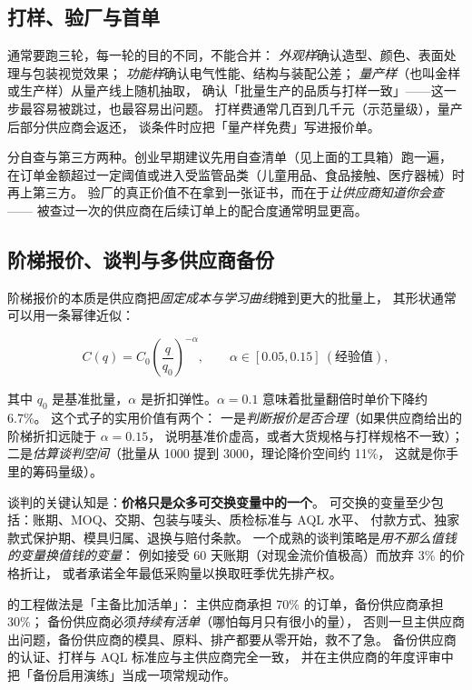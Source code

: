 \subsection{打样、验厂与首单}

通常要跑三轮，每一轮的目的不同，不能合并：
\emph{外观样}确认造型、颜色、表面处理与包装视觉效果；
\emph{功能样}确认电气性能、结构与装配公差；
\emph{量产样}（也叫金样或生产样）从量产线上随机抽取，
确认「批量生产的品质与打样一致」——这一步最容易被跳过，也最容易出问题。
打样费通常几百到几千元（示范量级），量产后部分供应商会返还，
谈条件时应把「量产样免费」写进报价单。

分自查与第三方两种。创业早期建议先用自查清单（见上面的工具箱）跑一遍，
在订单金额超过一定阈值或进入受监管品类（儿童用品、食品接触、医疗器械）时再上第三方。
验厂的真正价值不在拿到一张证书，而在于\emph{让供应商知道你会查}——
被查过一次的供应商在后续订单上的配合度通常明显更高。

\subsection{阶梯报价、谈判与多供应商备份}

阶梯报价的本质是供应商把\emph{固定成本与学习曲线}摊到更大的批量上，
其形状通常可以用一条幂律近似：

\begin{equation}
C(q) = C_0\left(\frac{q}{q_0}\right)^{-\alpha}, \qquad \alpha \in [0.05, 0.15] \ (\text{经验值}),
\label{eq:tierprice}
\end{equation}

其中 $q_0$ 是基准批量，$\alpha$ 是折扣弹性。$\alpha = 0.1$ 意味着批量翻倍时单价下降约 6.7\%。
这个式子的实用价值有两个：
一是\emph{判断报价是否合理}（如果供应商给出的阶梯折扣远陡于 $\alpha = 0.15$，
说明基准价虚高，或者大货规格与打样规格不一致）；
二是\emph{估算谈判空间}（批量从 1000 提到 3000，理论降价空间约 11\%，
这就是你手里的筹码量级）。

谈判的关键认知是：\textbf{价格只是众多可交换变量中的一个}。
可交换的变量至少包括：账期、MOQ、交期、包装与唛头、质检标准与 AQL 水平、
付款方式、独家款式保护期、模具归属、退换与赔付条款。
一个成熟的谈判策略是\emph{用不那么值钱的变量换值钱的变量}：
例如接受 60 天账期（对现金流价值极高）而放弃 3\% 的价格折让，
或者承诺全年最低采购量以换取旺季优先排产权。

的工程做法是「主备比加活单」：
主供应商承担 70\% 的订单，备份供应商承担 30\%；
备份供应商必须\emph{持续有活单}（哪怕每月只有很小的量），
否则一旦主供应商出问题，备份供应商的模具、原料、排产都要从零开始，救不了急。
备份供应商的认证、打样与 AQL 标准应与主供应商完全一致，
并在主供应商的年度评审中把「备份启用演练」当成一项常规动作。

